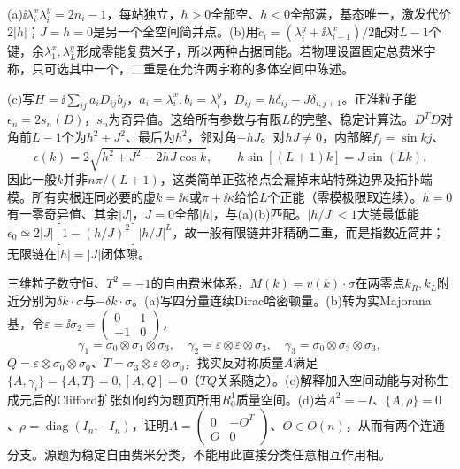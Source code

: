\begin{solution}
(a)$\ii\lambda_i^x\lambda_i^y=2n_i-1$，每站独立，$h>0$全部空、$h<0$全部满，基态唯一，激发代价$2|h|$；$J=h=0$是另一个全空间简并点。(b)用$\widetilde c_i=(\lambda_i^y+\ii\lambda_{i+1}^x)/2$配对$L-1$个键，余$\lambda_1^x,\lambda_L^y$形成零能复费米子，所以两种占据同能。若物理设置固定总费米宇称，只可选其中一个，二重是在允许两宇称的多体空间中陈述。

(c)写$H=\ii\sum_{ij}a_iD_{ij}b_j$，$a_i=\lambda_i^x,b_i=\lambda_i^y$，$D_{ij}=h\delta_{ij}-J\delta_{i,j+1}$。正准粒子能$\epsilon_n=2s_n(D)$，$s_n$为奇异值。这给所有参数与有限$L$的完整、稳定计算法。$D^TD$对角前$L-1$个为$h^2+J^2$、最后为$h^2$，邻对角$-hJ$。对$hJ\ne0$，内部解$f_j=\sin kj$、
\begin{equation}
\epsilon(k)=2\sqrt{h^2+J^2-2hJ\cos k},\qquad h\sin[(L+1)k]=J\sin(Lk).
\end{equation}
因此一般$k$并非$n\pi/(L+1)$，这类简单正弦格点会漏掉末站特殊边界及拓扑端模。所有实根连同必要的虚$k=\ii\kappa$或$\pi+\ii\kappa$给恰$L$个正能（零模极限取连续）。$h=0$有一零奇异值、其余$|J|$，$J=0$全部$|h|$，与(a)(b)匹配。$|h/J|<1$大链最低能$\epsilon_0\simeq2|J|[1-(h/J)^2]|h/J|^L$，故一般有限链并非精确二重，而是指数近简并；无限链在$|h|=|J|$闭体隙。
\end{solution}
\begin{exercise}[原题1(a)--(d)]
三维粒子数守恒、$T^2=-1$的自由费米体系，$M(k)=v(k)\cdot\sigma$在两零点$k_R,k_L$附近分别为$\delta k\cdot\sigma$与$-\delta k\cdot\sigma$。(a)写四分量连续Dirac哈密顿量。(b)转为实Majorana基，令$\varepsilon=\ii\sigma_2=\left(\begin{smallmatrix}0&1\\-1&0\end{smallmatrix}\right)$，
\begin{equation}
\gamma_1=\sigma_0\otimes\sigma_1\otimes\sigma_3,\quad\gamma_2=\varepsilon\otimes\varepsilon\otimes\sigma_3,\quad\gamma_3=\sigma_0\otimes\sigma_3\otimes\sigma_3,
\end{equation}
$Q=\varepsilon\otimes\sigma_0\otimes\sigma_0$、$T=\sigma_3\otimes\varepsilon\otimes\sigma_0$，找实反对称质量$A$满足$\{A,\gamma_i\}=\{A,T\}=0,[A,Q]=0$（$TQ$关系随之）。(c)解释加入空间动能与对称生成元后的Clifford扩张如何约为题页所用$R_0^1$质量空间。(d)若$A^2=-I$、$\{A,\rho\}=0$、$\rho=\operatorname{diag}(I_n,-I_n)$，证明$A=\left(\begin{smallmatrix}0&-O^T\\O&0\end{smallmatrix}\right)$、$O\in O(n)$，从而有两个连通分支。源题为稳定自由费米分类，不能用此直接分类任意相互作用相。
\end{exercise}
